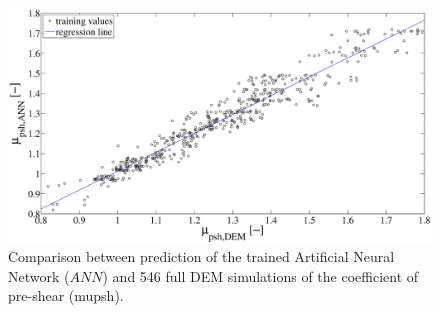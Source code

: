 \begin{figure}%
\centering 
\includegraphics[width=.80\columnwidth]{images/022regression.eps}
\caption[Comparison between prediction of the trained ANN and full DEM
simulation]{Comparison between prediction of the trained Artificial Neural
Network ($ANN$) and 546 
full DEM simulations of the coefficient of pre-shear
(\ac{mupsh}).}
\label{fig:022regression} 
\end{figure}